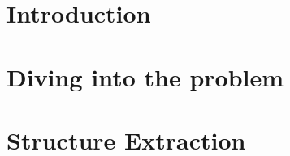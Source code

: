 \documentclass{report}
\begin{document}
\chapter{Introduction}


\chapter{Diving into the problem}


\chapter{Structure Extraction}

\end{document}
